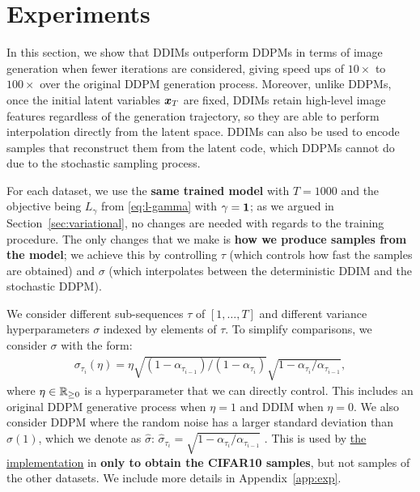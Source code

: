 \section{Experiments}
\label{sec:experiments}

In this section, we show that DDIMs outperform DDPMs in terms of image generation when fewer iterations are considered, giving speed ups of $10\times$ to $100\times$ over the original DDPM generation process. %
Moreover, unlike DDPMs, once the initial latent variables ${\bm{x}}_T$ are fixed, DDIMs retain high-level image features regardless of the generation trajectory, so they are able to perform interpolation directly from the latent space. DDIMs can also be used to encode samples that reconstruct them from the latent code, which DDPMs cannot do due to the stochastic sampling process.

For each dataset, we use the \textbf{same trained model} with $T = 1000$ and the objective being $L_\gamma$ from \eqref{eq:l-gamma} with $\gamma = {\bm{1}}$; as we argued in Section~\ref{sec:variational}, no changes are needed with regards to the training procedure.
The only changes that we make is \textbf{how we produce samples from the model}; we achieve this by controlling $\tau$ (which controls how fast the samples are obtained) and $\sigma$ (which interpolates between the deterministic DDIM and the stochastic DDPM).

We consider different sub-sequences $\tau$ of $[1, \ldots, T]$ and different variance hyperparameters $\sigma$ indexed by elements of $\tau$. To simplify comparisons, we consider $\sigma$ with the form:
\begin{align}
    \sigma_{\tau_{i}}(\eta) = \eta \sqrt{(1 - \alpha_{\tau_{i-1}})/(1 - \alpha_{\tau_{i}})}\sqrt{1 - {\alpha_{\tau_i}}/{\alpha_{\tau_{i-1}}}}, %
\end{align}
where $\eta \in \mathbb{R}_{\geq 0}$ is a hyperparameter that we can directly control. This includes an original DDPM generative process when $\eta = 1$ and DDIM when $\eta = 0$. We also consider DDPM where the random noise has a larger standard deviation than $\sigma(1)$, which we denote as $\hat{\sigma}$:
$
    \hat{\sigma}_{\tau_{i}} = \sqrt{1 - {\alpha_{\tau_i}}/{\alpha_{\tau_{i-1}}}}%
$
. This is used by \href{https://github.com/hojonathanho/diffusion/blob/master/scripts/run_cifar.py#L136}{\underline{the implementation}} in \cite{ho2020denoising} \textbf{only to obtain the CIFAR10 samples}, but not samples of the other datasets. We include more details in Appendix~\ref{app:exp}. %

